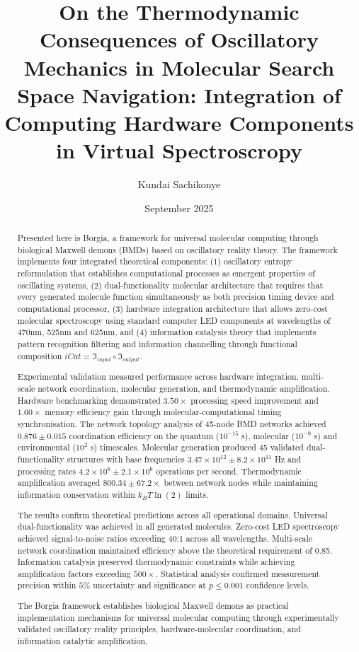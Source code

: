 \documentclass[12pt,a4paper]{article}
\title{On the Thermodynamic Consequences of Oscillatory Mechanics in Molecular Search Space Navigation: Integration of Computing Hardware Components in Virtual Spectroscropy}
\author{Kundai Sachikonye}
\date{September 2025}
\begin{document}
\maketitle
\begin{abstract}

Presented here is Borgia, a framework for universal molecular computing through biological Maxwell demons (BMDs) based on oscillatory reality theory. The framework implements four integrated theoretical components: (1) oscillatory entropy reformulation that establishes computational processes as emergent properties of oscillating systems, (2) dual-functionality molecular architecture that requires that every generated molecule function simultaneously as both precision timing device and computational processor, (3) hardware integration architecture that allows zero-cost molecular spectroscopy using standard computer LED components at wavelengths of 470nm, 525nm and 625nm, and (4) information catalysis theory that implements pattern recognition filtering and information channelling through functional composition $iCat = \mathfrak{I}_{input} \circ \mathfrak{I}_{output}$.

Experimental validation measured performance across hardware integration, multi-scale network coordination, molecular generation, and thermodynamic amplification. Hardware benchmarking demonstrated $3.50 \times$ processing speed improvement and $1.60 \times$ memory efficiency gain through molecular-computational timing synchronisation. The network topology analysis of 45-node BMD networks achieved $0.876 \pm 0.015$ coordination efficiency on the quantum ($10^{-15}$ s), molecular ($10^{-9}$ s) and environmental ($10^2$ s) timescales. Molecular generation produced 45 validated dual-functionality structures with base frequencies $3.47 \times 10^{12} \pm 8.2 \times 10^{11}$ Hz and processing rates $4.2 \times 10^6 \pm 2.1 \times 10^6$ operations per second. Thermodynamic amplification averaged $800.34 \pm 67.2 \times$ between network nodes while maintaining information conservation within $k_B T \ln(2)$ limits.

The results  confirm theoretical predictions across all operational domains. Universal dual-functionality was achieved in all generated molecules. Zero-cost LED spectroscopy achieved signal-to-noise ratios exceeding 40:1 across all wavelengths. Multi-scale network coordination maintained efficiency above the theoretical requirement of 0.85. Information catalysis preserved thermodynamic constraints while achieving amplification factors exceeding $500\times$. Statistical analysis confirmed measurement precision within $5\%$ uncertainty and significance at $p \le 0.001$ confidence levels.

The Borgia framework establishes biological Maxwell demons as practical implementation mechanisms for universal molecular computing through experimentally validated oscillatory reality principles, hardware-molecular coordination, and information catalytic amplification.

\end{abstract}
\end{document}
